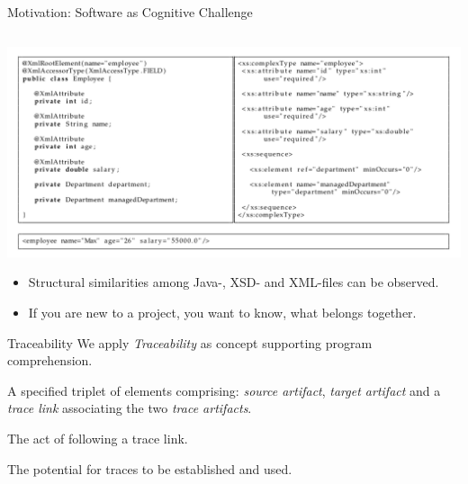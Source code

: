 \documentclass{beamer}
\begin{document}
\begin{frame}{Motivation: Software as Cognitive Challenge}
\begin{columns}
\end{columns}
\pagebreak
\begin{center}
\includegraphics[width=\textwidth]{MotivationalExample.png}
\end{center}
\footnotesize
\begin{itemize}
\item
Structural similarities among Java-, XSD- and XML-files can be observed.
\item
If you are new to a project, you want to know, what belongs together.
\end{itemize}

\end{frame}

\begin{frame}{Traceability}
We apply \textit{Traceability} as concept supporting program comprehension.
\begin{definition}[Trace]
\begin{description}[align=left]
\item[(Noun)]
A specified triplet of elements comprising: \emph{source artifact}, \emph{target artifact} and a \emph{trace link} associating the two \emph{trace artifacts}. \cite{DBLP:books/daglib/p/GotelCHZEGDAMM12}
\item[(Verb)]
The act of following a trace link. \cite{DBLP:books/daglib/p/GotelCHZEGDAMM12}
\end{description}
\end{definition}
\begin{definition}[Traceability]
The potential for traces to be established and used.
\cite{DBLP:books/daglib/p/GotelCHZEGDAMM12}
\end{definition}

\end{frame}
\end{document}
